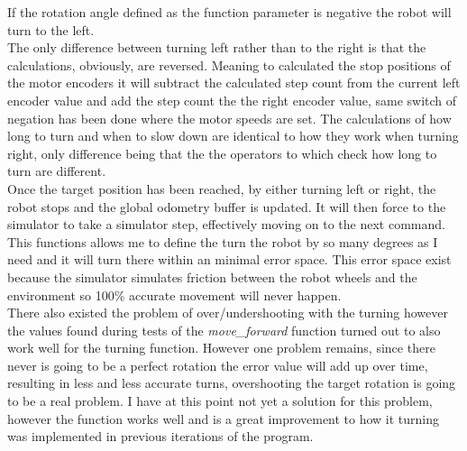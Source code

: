 If the rotation angle defined as the function parameter is negative the robot will turn to the left.\\
The only difference between turning left rather than to the right is that the calculations, obviously, are reversed. Meaning to calculated the stop positions of the motor encoders it will subtract the calculated step count from the current left encoder value and add the step count the the right
encoder value, same switch of negation has been done where the motor speeds are set.
The calculations of how long to turn and when to slow down are identical to how they work when turning right, only difference being that the the operators to which check how long to turn are different.\\
Once the target position has been reached, by either turning left or right, the robot stops and the global odometry buffer is updated. 
It will then force to the simulator to take a simulator step, effectively moving on to the next command.\\[3ex]

This functions allows me to define the turn the robot by so many degrees as I need and it will turn there within an minimal error space. This error space exist because the simulator simulates friction between the robot wheels and the environment so 100\% accurate movement will never happen.\\
There also existed the problem of over/undershooting with the turning however the values found during tests of the \textit{move\_forward} function turned out to also work well for the turning function. However one problem remains, since there never is going to be a perfect rotation the error value will add up over time, resulting in less and less accurate turns, overshooting the target rotation is going to be a real problem. I have at this point not yet a solution for this problem, however the function works well and is a great improvement to how it turning was implemented in previous iterations of the program.

